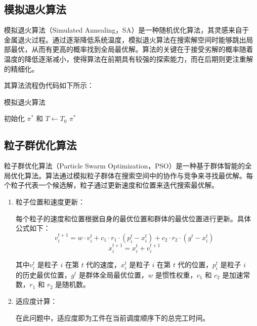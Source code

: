 \documentclass[12pt]{article}
\begin{document}
	\subsection{模拟退火算法}
	模拟退火算法（Simulated Annealing，SA）是一种随机优化算法，其灵感来自于金属退火过程。通过逐渐降低系统温度，模拟退火算法在搜索解空间时能够跳出局部最优，从而有更高的概率找到全局最优解。算法的关键在于接受劣解的概率随着温度的降低逐渐减小，使得算法在前期具有较强的探索能力，而在后期则更注重解的精细化。
	
	其算法流程伪代码如下所示：

	\begin{algorithm}[H]
		\caption{模拟退火算法}
		初始化 $\pi^*$ 和 $T \leftarrow T_0$\;
		\Return $\pi^*$
	\end{algorithm}
	
	\subsection{粒子群优化算法}
	粒子群优化算法（Particle Swarm Optimization，PSO）是一种基于群体智能的全局优化算法\cite{ref0}。算法通过模拟粒子群体在搜索空间中的协作与竞争来寻找最优解。每个粒子代表一个候选解，粒子通过更新速度和位置来迭代搜索最优解。
	
	\begin{enumerate}
		\item 粒子位置和速度更新：
		
		每个粒子的速度和位置根据自身的最优位置和群体的最优位置进行更新。具体公式如下：
		\[
		v_{i}^{t+1} = w \cdot v_{i}^{t} + c_1 \cdot r_1 \cdot (p_{i}^{t} - x_{i}^{t}) + c_2 \cdot r_2 \cdot (g^{t} - x_{i}^{t})
		\]
		\[
		x_{i}^{t+1} = x_{i}^{t} + v_{i}^{t+1}
		\]
		
		其中\( v_{i}^{t} \) 是粒子 \( i \) 在第 \( t \) 代的速度，\( x_{i}^{t} \) 是粒子 \( i \) 在第 \( t \) 代的位置，\( p_{i}^{t} \) 是粒子 \( i \) 的历史最优位置，\( g^{t} \) 是群体全局最优位置，\( w \) 是惯性权重，\( c_1 \) 和 \( c_2 \) 是加速常数，\( r_1 \) 和 \( r_2 \) 是随机数。
		
		\item 适应度计算：
		
		在此问题中，适应度即为工件在当前调度顺序下的总完工时间\cite{ref1}。
	\end{enumerate}
	
\end{document}
